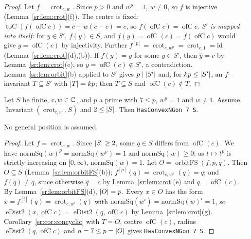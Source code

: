 \begin{proof}
Let $f=\operatorname{crot}_{c,w}$. Since $p>0$ and $w^p=1$, $w\ne0$, so $f$ is injective (Lemma~\ref{sr:lem:crot}(f)).
The centre is fixed: $\operatorname{toC}(f(\operatorname{ofC}c))=c+w(c-c)=c$, so $f(\operatorname{ofC}c)=\operatorname{ofC}c$.
\emph{$S'$ is mapped into itself:} for $y\in S'$, $f(y)\in S$, and $f(y)=\operatorname{ofC}(c)=f(\operatorname{ofC}c)$
would give $y=\operatorname{ofC}(c)$ by injectivity. Further $f^{[p]}=\operatorname{crot}_{c,w^p}=\operatorname{crot}_{c,1}=
\mathrm{id}$ (Lemma~\ref{sr:lem:crot}(d),(b)). If $f(y)=y$ for some $y\in S'$, then $\hat y=c$ by
Lemma~\ref{sr:lem:crot}(e), so $y=\operatorname{ofC}(c)\notin S'$, a contradiction. Lemma~\ref{sr:lem:orbit}(b) applied
to $S'$ gives $p\mid\lvert S'\rvert$ and, for $kp\le\lvert S'\rvert$, an $f$-invariant $T\subseteq S'$ with $\lvert T\rvert=kp$; then
$T\subseteq S$ and $\operatorname{ofC}(c)\notin T$.
\end{proof}

\begin{lemma}\label{sr:lem:rot-big}
Let $S$ be finite, $c,w\in\mathbb C$, and $p$ a prime with $7\le p$, $w^p=1$ and $w\ne1$. Assume
$\operatorname{Invariant}(\operatorname{crot}_{c,w},S)$ and $2\le\lvert S\rvert$. Then \texttt{HasConvexNGon 7 S}.
\end{lemma}

No general position is assumed.

\begin{proof}
Let $f=\operatorname{crot}_{c,w}$. Since $\lvert S\rvert\ge2$, some $q\in S$ differs from $\operatorname{ofC}(c)$. We have
$\mathrm{normSq}(w)^p=\mathrm{normSq}(w^p)=1$ and $\mathrm{normSq}(w)\ge0$; as $t\mapsto t^p$ is strictly increasing on
$[0,\infty)$, $\mathrm{normSq}(w)=1$. Let $O=\operatorname{orbitFS}(f,p,q)$. Then $O\subseteq S$
(Lemma~\ref{sr:lem:orbitFS}(b)); $f^{[p]}(q)=\operatorname{crot}_{c,w^p}(q)=q$; and $f(q)\ne q$, since otherwise $\hat
q=c$ by Lemma~\ref{sr:lem:crot}(e) and $q=\operatorname{ofC}(c)$. By Lemma~\ref{sr:lem:orbitFS}(d), $\lvert O\rvert=p$. Every
$x\in O$ has the form $x=f^{[i]}(q)=\operatorname{crot}_{c,w^i}(q)$ with $\mathrm{normSq}(w^i)=\mathrm{normSq}(w)^i=1$, so
$\operatorname{eDist2}(x,\operatorname{ofC}c)=\operatorname{eDist2}(q,\operatorname{ofC}c)$ by
Lemma~\ref{sr:lem:crot}(g). Corollary~\ref{sr:cor:concyclic} with $T=O$, centre $\operatorname{ofC}(c)$, radius
$\operatorname{eDist2}(q,\operatorname{ofC}c)$ and $n=7\le p=\lvert O\rvert$ gives \texttt{HasConvexNGon 7 S}.
\end{proof}

